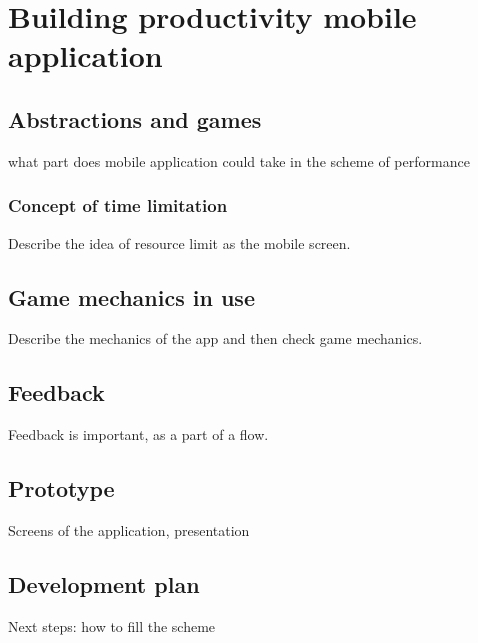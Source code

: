 \chapter{Building productivity mobile application}

\section{Abstractions and games}
what part does mobile application could take in the scheme of performance

\subsection{Concept of time limitation}

Describe the idea of resource limit as the mobile screen.

\section{Game mechanics in use}

Describe the mechanics of the app and then check game mechanics.

\section{Feedback}

Feedback is important, as a part of a flow.

\section{Prototype}

Screens of the application, presentation

\section{Development plan}

Next steps: how to fill the scheme